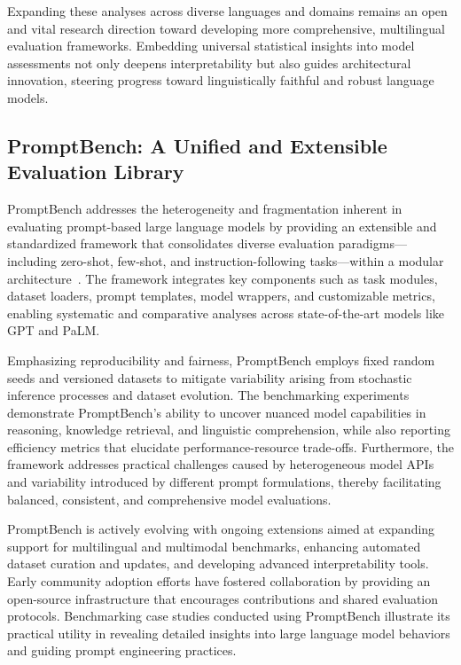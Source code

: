 \documentclass[sigconf]{acmart}
\begin{document}
Expanding these analyses across diverse languages and domains remains an open and vital research direction toward developing more comprehensive, multilingual evaluation frameworks. Embedding universal statistical insights into model assessments not only deepens interpretability but also guides architectural innovation, steering progress toward linguistically faithful and robust language models.

\subsection{PromptBench: A Unified and Extensible Evaluation Library}

PromptBench addresses the heterogeneity and fragmentation inherent in evaluating prompt-based large language models by providing an extensible and standardized framework that consolidates diverse evaluation paradigms—including zero-shot, few-shot, and instruction-following tasks—within a modular architecture~\cite{ref6}. The framework integrates key components such as task modules, dataset loaders, prompt templates, model wrappers, and customizable metrics, enabling systematic and comparative analyses across state-of-the-art models like GPT and PaLM.

Emphasizing reproducibility and fairness, PromptBench employs fixed random seeds and versioned datasets to mitigate variability arising from stochastic inference processes and dataset evolution. The benchmarking experiments demonstrate PromptBench's ability to uncover nuanced model capabilities in reasoning, knowledge retrieval, and linguistic comprehension, while also reporting efficiency metrics that elucidate performance-resource trade-offs. Furthermore, the framework addresses practical challenges caused by heterogeneous model APIs and variability introduced by different prompt formulations, thereby facilitating balanced, consistent, and comprehensive model evaluations.

PromptBench is actively evolving with ongoing extensions aimed at expanding support for multilingual and multimodal benchmarks, enhancing automated dataset curation and updates, and developing advanced interpretability tools. Early community adoption efforts have fostered collaboration by providing an open-source infrastructure that encourages contributions and shared evaluation protocols. Benchmarking case studies conducted using PromptBench illustrate its practical utility in revealing detailed insights into large language model behaviors and guiding prompt engineering practices. 
\end{document}
